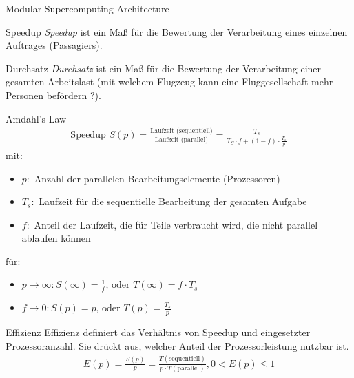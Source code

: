 \begin{bonus}{Modular Supercomputing Architecture}

\end{bonus}

\begin{defi}{Speedup}
    \emph{Speedup} ist ein Maß für die Bewertung der Verarbeitung eines einzelnen Auftrages (Passagiers).
\end{defi}

\begin{defi}{Durchsatz}
    \emph{Durchsatz} ist ein Maß für die Bewertung der Verarbeitung einer gesamten Arbeitslast
    (mit welchem Flugzeug kann eine Fluggesellschaft mehr Personen befördern ?).
\end{defi}

\begin{defi}{Amdahl's Law}
    \begin{align*}
        \text{Speedup }S(p)=
        \frac{\text{Laufzeit (sequentiell)}}{\text{Laufzeit (parallel)}} =
        \frac{T_s}{T_S \cdot f + (1-f) \cdot \frac{T_s}{p}}
    \end{align*}
    mit:
    \begin{itemize}
        \item $p:$ Anzahl der parallelen Bearbeitungselemente (Prozessoren)
        \item $T_s:$ Laufzeit für die sequentielle Bearbeitung der gesamten Aufgabe
        \item $f:$ Anteil der Laufzeit, die für Teile verbraucht wird, die nicht parallel ablaufen können
    \end{itemize}
    für:
    \begin{itemize}
        \item $p\to\infty: S(\infty) = \frac{1}{f} \text{, oder } T(\infty) = f \cdot T_s$
        \item $f\to 0: S(p) = p \text{, oder } T(p) = \frac{T_s}{p}$
    \end{itemize}
\end{defi}

\begin{defi}{Effizienz}
    Effizienz definiert das Verhältnis von Speedup und eingesetzter Prozessoranzahl.
    Sie drückt aus, welcher Anteil der Prozessorleistung nutzbar ist.
    \begin{align*}
        E(p) = \frac{S(p)}{p} =
        \frac{T(\text{sequentiell})}{p\cdot T(\text{parallel})},
        0<E(p)\leq 1
    \end{align*}
\end{defi}

